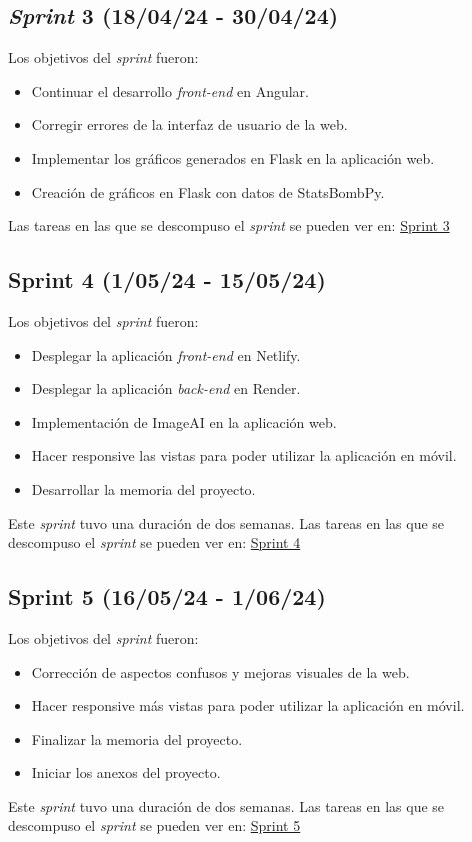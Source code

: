 \subsection{\textbf{\textit{Sprint} 3 (18/04/24 - 30/04/24)}} 
Los objetivos del \textit{sprint} fueron:
\begin{itemize}
    \item Continuar el desarrollo \textit{front-end} en Angular.
    \item Corregir errores de la interfaz de usuario de la web.
    \item Implementar los gráficos generados en Flask en la aplicación web.
    \item Creación de gráficos en Flask con datos de StatsBombPy.
\end{itemize}
Las tareas en las que se descompuso el \textit{sprint} se pueden ver en:
\href{https://github.com/MiguelExtremo/TFG/milestone/3?closed=1}{Sprint 3}
\subsection{\textbf{Sprint 4 (1/05/24 - 15/05/24)}} 
Los objetivos del \textit{sprint} fueron:
\begin{itemize}
    \item Desplegar la aplicación \textit{front-end} en Netlify.
    \item Desplegar la aplicación \textit{back-end} en Render.
    \item Implementación de ImageAI en la aplicación web.
    \item Hacer responsive las vistas para poder utilizar la aplicación en móvil.
    \item Desarrollar la memoria del proyecto.
\end{itemize}
Este \textit{sprint} tuvo una duración de dos semanas.
Las tareas en las que se descompuso el \textit{sprint} se pueden ver en:
\href{https://github.com/MiguelExtremo/TFG/milestone/4?closed=1}{Sprint 4}

\subsection{\textbf{Sprint 5 (16/05/24 - 1/06/24)}}
Los objetivos del \textit{sprint} fueron:
\begin{itemize}
    \item Corrección de aspectos confusos y mejoras visuales de la web.
    \item Hacer responsive más vistas para poder utilizar la aplicación en móvil.
    \item Finalizar la memoria del proyecto. 
    \item Iniciar los anexos del proyecto.
\end{itemize}
Este \textit{sprint} tuvo una duración de dos semanas.
Las tareas en las que se descompuso el \textit{sprint} se pueden ver en:
\href{https://github.com/MiguelExtremo/TFG/milestone/5?closed=1}{Sprint 5}

